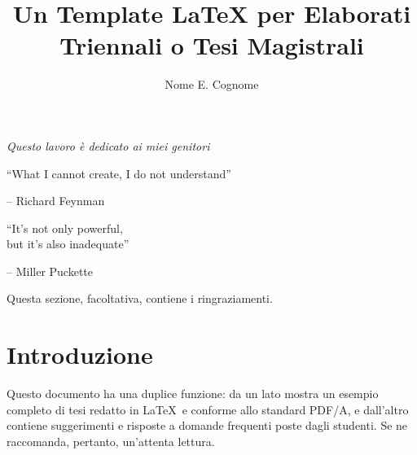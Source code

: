 \documentclass[12pt]{report}
\title{Un Template LaTeX per Elaborati Triennali o Tesi Magistrali}
\author{Nome E. Cognome}
\begin{document}
\makefrontpage

% 
%

{\raggedleft \large \sl Questo lavoro \`{e} dedicato ai miei genitori\\
	
	\vspace{2cm}
	
	``What I cannot create, I do not understand''
	
	\bigskip
	
	\--- Richard Feynman\\
  
	\vspace{2cm}
	
	``It's not only powerful,\\but it's also inadequate''
	
	\bigskip
	
	\--- Miller Puckette\\}

\clearpage
\beforepreface

% 
%


%
%

Questa sezione, facoltativa, contiene i ringraziamenti.

%
%

\afterpreface

% 
% 

\chapter{Introduzione}
\label{cap:introduzione}

Questo documento ha una duplice funzione: da un lato mostra un esempio completo di tesi redatto in \LaTeX\ e conforme allo standard PDF/A, e dall'altro contiene suggerimenti e risposte a domande frequenti poste dagli studenti. Se ne raccomanda, pertanto, un'attenta lettura.
\end{document}
